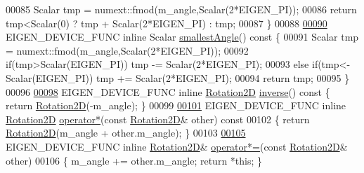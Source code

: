 \begin{DoxyCode}
00085     Scalar tmp = numext::fmod(m\_angle,Scalar(2*EIGEN\_PI));
00086     \textcolor{keywordflow}{return} tmp<Scalar(0) ? tmp + Scalar(2*EIGEN\_PI) : tmp;
00087   \}
00088   
\hyperlink{group___geometry___module_a38e64a85197dc268a3e7832e75e469c7}{00090}   EIGEN\_DEVICE\_FUNC \textcolor{keyword}{inline} Scalar \hyperlink{group___geometry___module_a38e64a85197dc268a3e7832e75e469c7}{smallestAngle}()\textcolor{keyword}{ const }\{
00091     Scalar tmp = numext::fmod(m\_angle,Scalar(2*EIGEN\_PI));
00092     \textcolor{keywordflow}{if}(tmp>Scalar(EIGEN\_PI))       tmp -= Scalar(2*EIGEN\_PI);
00093     \textcolor{keywordflow}{else} \textcolor{keywordflow}{if}(tmp<-Scalar(EIGEN\_PI)) tmp += Scalar(2*EIGEN\_PI);
00094     \textcolor{keywordflow}{return} tmp;
00095   \}
00096 
\hyperlink{group___geometry___module_a31e2adeabbde2a5210237f903fc40600}{00098}   EIGEN\_DEVICE\_FUNC \textcolor{keyword}{inline} \hyperlink{group___geometry___module_class_eigen_1_1_rotation2_d}{Rotation2D} \hyperlink{group___geometry___module_a31e2adeabbde2a5210237f903fc40600}{inverse}()\textcolor{keyword}{ const }\{ \textcolor{keywordflow}{return} 
      \hyperlink{group___geometry___module_class_eigen_1_1_rotation2_d}{Rotation2D}(-m\_angle); \}
00099 
\hyperlink{group___geometry___module_a3a6cdaeaac6610b810aba08d514af49d}{00101}   EIGEN\_DEVICE\_FUNC \textcolor{keyword}{inline} \hyperlink{group___geometry___module_class_eigen_1_1_rotation2_d}{Rotation2D} \hyperlink{group___geometry___module_a3a6cdaeaac6610b810aba08d514af49d}{operator*}(\textcolor{keyword}{const} 
      \hyperlink{group___geometry___module_class_eigen_1_1_rotation2_d}{Rotation2D}& other)\textcolor{keyword}{ const}
00102 \textcolor{keyword}{  }\{ \textcolor{keywordflow}{return} \hyperlink{group___geometry___module_class_eigen_1_1_rotation2_d}{Rotation2D}(m\_angle + other.m\_angle); \}
00103 
\hyperlink{group___geometry___module_a6c4bcdd365f7df12b86e8eb07a221eea}{00105}   EIGEN\_DEVICE\_FUNC \textcolor{keyword}{inline} \hyperlink{group___geometry___module_class_eigen_1_1_rotation2_d}{Rotation2D}& \hyperlink{group___geometry___module_a6c4bcdd365f7df12b86e8eb07a221eea}{operator*=}(\textcolor{keyword}{const} 
      \hyperlink{group___geometry___module_class_eigen_1_1_rotation2_d}{Rotation2D}& other)
00106   \{ m\_angle += other.m\_angle; \textcolor{keywordflow}{return} *\textcolor{keyword}{this}; \}

\end{DoxyCode}
